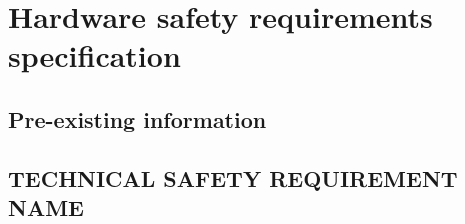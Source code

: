 \section{Hardware safety requirements specification}
%
%

\subsection{Pre-existing information}
%

\subsection{TECHNICAL SAFETY REQUIREMENT NAME}
%
%
%
%
